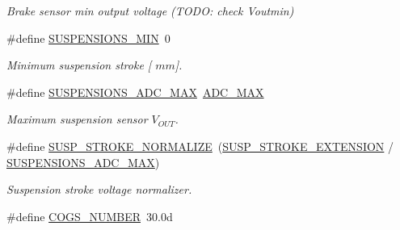 \begin{DoxyCompactItemize}
\begin{DoxyCompactList}\small\item\em Brake sensor min output voltage (T\+O\+DO\+: check Voutmin) \end{DoxyCompactList}\item 
\mbox{\label{group___board__model__group_ga2445bb784c1bcde9b88c5f81fc814055}} 
\#define \mbox{\hyperlink{group___board__model__group_ga2445bb784c1bcde9b88c5f81fc814055}{S\+U\+S\+P\+E\+N\+S\+I\+O\+N\+S\+\_\+\+M\+IN}}~0
\begin{DoxyCompactList}\small\item\em Minimum suspension stroke \mbox{[} $mm$\mbox{]}. \end{DoxyCompactList}\item 
\mbox{\label{group___board__model__group_gaf662e0e156dae3a519648a2f10fa3635}} 
\#define \mbox{\hyperlink{group___board__model__group_gaf662e0e156dae3a519648a2f10fa3635}{S\+U\+S\+P\+E\+N\+S\+I\+O\+N\+S\+\_\+\+A\+D\+C\+\_\+\+M\+AX}}~\mbox{\hyperlink{group___board__model__group_ga555a695bf58df062dc03f0e892d95cd7}{A\+D\+C\+\_\+\+M\+AX}}
\begin{DoxyCompactList}\small\item\em Maximum suspension sensor $V_{OUT}$. \end{DoxyCompactList}\item 
\mbox{\label{group___board__model__group_gadad409d745f70ca3c312ca3914a43822}} 
\#define \mbox{\hyperlink{group___board__model__group_gadad409d745f70ca3c312ca3914a43822}{S\+U\+S\+P\+\_\+\+S\+T\+R\+O\+K\+E\+\_\+\+N\+O\+R\+M\+A\+L\+I\+ZE}}~(\mbox{\hyperlink{group___board__model__group_gafd34b4e5a1067ffe9bfb1cb18b5973e6}{S\+U\+S\+P\+\_\+\+S\+T\+R\+O\+K\+E\+\_\+\+E\+X\+T\+E\+N\+S\+I\+ON}} / \mbox{\hyperlink{group___board__model__group_gaf662e0e156dae3a519648a2f10fa3635}{S\+U\+S\+P\+E\+N\+S\+I\+O\+N\+S\+\_\+\+A\+D\+C\+\_\+\+M\+AX}})
\begin{DoxyCompactList}\small\item\em Suspension stroke voltage normalizer. \end{DoxyCompactList}\item 
\mbox{\label{group___board__model__group_gab4fd15d90627818134453e8399055f7d}} 
\#define \mbox{\hyperlink{group___board__model__group_gab4fd15d90627818134453e8399055f7d}{C\+O\+G\+S\+\_\+\+N\+U\+M\+B\+ER}}~30.\+0d

\end{DoxyCompactItemize}
